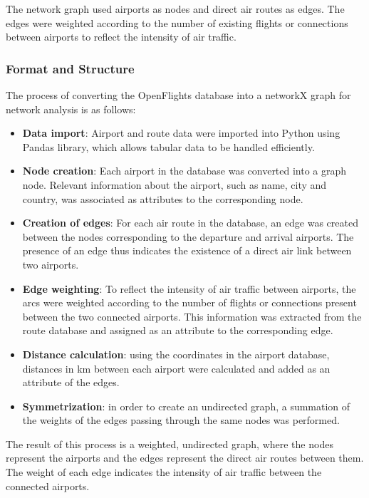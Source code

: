 \documentclass[12pt]{article}
\begin{document}
    The network graph used airports as nodes and direct air routes as edges. The edges were weighted according to the number of existing flights or connections between airports to reflect the intensity of air traffic.

    \subsubsection{Format and Structure}
    The process of converting the OpenFlights database into a networkX graph for network analysis is as follows:
    \begin{itemize}
        \item \textbf{Data import}: Airport and route data were imported into Python using Pandas library, which allows tabular data to be handled efficiently.
        \item \textbf{Node creation}: Each airport in the database was converted into a graph node. Relevant information about the airport, such as name, city and country, was associated as attributes to the corresponding node.
        \item \textbf{Creation of edges}: For each air route in the database, an edge was created between the nodes corresponding to the departure and arrival airports. The presence of an edge thus indicates the existence of a direct air link between two airports.
        \item \textbf{Edge weighting}: To reflect the intensity of air traffic between airports, the arcs were weighted according to the number of flights or connections present between the two connected airports. This information was extracted from the route database and assigned as an attribute to the corresponding edge.
        \item \textbf{Distance calculation}: using the coordinates in the airport database, distances in km between each airport were calculated and added as an attribute of the edges.
        \item \textbf{Symmetrization}: in order to create an undirected graph, a summation of the weights of the edges passing through the same nodes was performed.
    \end{itemize}
    The result of this process is a weighted, undirected graph, where the nodes represent the airports and the edges represent the direct air routes between them. The weight of each edge indicates the intensity of air traffic between the connected airports.
\end{document}
